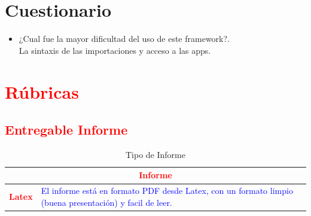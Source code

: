 \documentclass{article}
\begin{document}
\section{Cuestionario}
	\begin{itemize}
		\item ¿Cual fue la mayor dificultad del uso de este framework?.
        \\La sintaxis de las importaciones y acceso a las apps.
	\end{itemize}		

	\section{\textcolor{red}{Rúbricas}}
	
	\subsection{\textcolor{red}{Entregable Informe}}
	\begin{table}[H]
		\caption{Tipo de Informe}
		\setlength{\tabcolsep}{0.5em} %
		{\renewcommand{\arraystretch}{1.5}%
		\begin{tabular}{|p{3cm}|p{12cm}|}
			\hline
			\multicolumn{2}{|c|}{\textbf{\textcolor{red}{Informe}}}  \\
			\hline 
			\textbf{\textcolor{red}{Latex}} & \textcolor{blue}{El informe está en formato PDF desde Latex,  con un formato limpio (buena presentación) y facil de leer.}   \\ 
			\hline 
			
			
		\end{tabular}
	}
	\end{table}
	
	\clearpage
	
\end{document}

